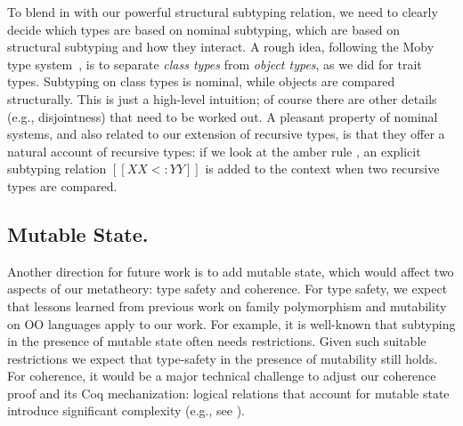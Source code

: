 To blend in with our powerful structural subtyping relation, we need to clearly
decide which types are based on nominal subtyping, which are based on structural
subtyping and how they interact. A rough idea, following the \textsf{Moby} type
system~\citep{fisher2000extending}, is to separate \textit{class types} from
\textit{object types}, as we did for trait types. Subtyping on class types is
nominal, while objects are compared structurally. This is just a high-level
intuition; of course there are other details (e.g., disjointness) that need to
be worked out. A pleasant property of nominal systems, and also related to our
extension of recursive types, is that they offer a natural account of recursive
types: if we look at the amber rule , an explicit subtyping
relation $[[XX <: YY]]$ is added to the context when two recursive types are
compared.



\subsection{Mutable State.}

Another direction for future work is to add mutable state, which would affect
two aspects of our metatheory: type safety and coherence. For type safety, we
expect that lessons learned from previous work on family polymorphism and
mutability on OO languages apply to our work. For example, it is well-known that
subtyping in the presence of mutable state often needs restrictions. Given such
suitable restrictions we expect that type-safety in the presence of mutability
still holds. For coherence, it would be a major technical challenge to adjust
our coherence proof and its Coq mechanization: logical relations that account
for mutable state introduce significant complexity (e.g., see
\citet{ahmed2004semantics}).






